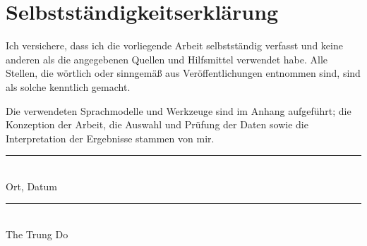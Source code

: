 %

\section*{Selbstständigkeitserklärung}

Ich versichere, dass ich die vorliegende Arbeit selbstständig verfasst und keine anderen
als die angegebenen Quellen und Hilfsmittel verwendet habe. Alle Stellen, die wörtlich
oder sinngemäß aus Veröffentlichungen entnommen sind, sind als solche kenntlich gemacht.

\vspace{0.6cm}
\noindent
Die verwendeten Sprachmodelle und Werkzeuge sind im Anhang aufgeführt; die Konzeption der
Arbeit, die Auswahl und Prüfung der Daten sowie die Interpretation der Ergebnisse stammen
von mir.

\vspace{2.2cm}
\noindent
\begin{minipage}{0.45\textwidth}
  \rule{\linewidth}{0.4pt}\\
  \small Ort, Datum
\end{minipage}
\hfill
\begin{minipage}{0.45\textwidth}
  \rule{\linewidth}{0.4pt}\\
  \small The Trung Do
\end{minipage}
